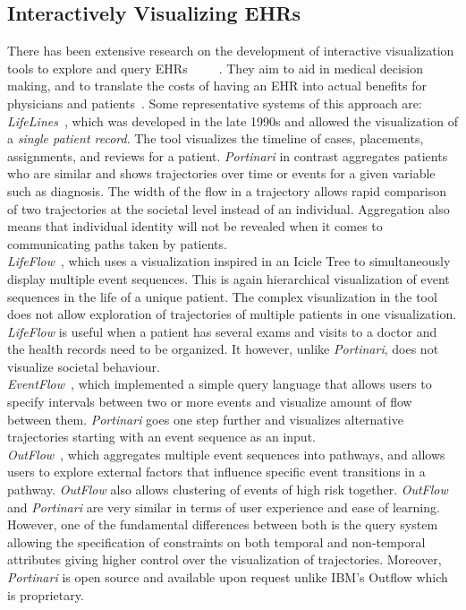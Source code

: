 \documentclass[10pt, conference]{IEEEtran}
\begin{document}
\subsection{Interactively Visualizing EHRs}
There has been extensive research on the development of interactive visualization tools to explore and query EHRs~\cite{LifeLines}~\cite{LifeFlow}~\cite{EventFlow}~\cite{OutFlow}~\cite{DecisionFlow}.  They aim to aid in medical decision making, and to translate the costs of having an EHR into actual benefits for physicians and patients~\cite{EhrVisSurvey}. 
Some representative systems of this approach are:\\
\noindent \textit{LifeLines}~\cite{LifeLines}, which was developed in the late 1990s and allowed the visualization of a \emph{single patient record}. The tool visualizes the timeline of cases, placements, assignments, and reviews for a patient. \textit{Portinari} in contrast aggregates patients who are similar and shows trajectories over time or events for a given variable such as diagnosis. The width of the flow in a trajectory allows rapid comparison of two trajectories at the societal level instead of an individual. Aggregation also means that individual identity will not be revealed when it comes to communicating paths taken by patients.\\
\noindent \textit{LifeFlow}~\cite{LifeFlow}, which uses a visualization inspired in an Icicle Tree to simultaneously display multiple event sequences. This is again hierarchical visualization of event sequences in the life of a unique patient. The complex visualization in the tool  does not allow exploration of trajectories of multiple patients in one visualization. \textit{LifeFlow} is useful when a patient has several exams and visits to a doctor and the health records need to be organized. It however, unlike \textit{Portinari}, does not visualize societal behaviour.\\
\noindent \textit{EventFlow}~\cite{EventFlow}, which implemented a simple query language that allows users to specify intervals between two or more events and visualize amount of flow between them. \textit{Portinari} goes one step further and visualizes alternative trajectories starting with an event sequence as an input. \\
\noindent \textit{OutFlow}~\cite{OutFlow}, which aggregates multiple event sequences into pathways, and allows users to explore external factors that influence  specific event transitions in a pathway. \textit{OutFlow} also allows clustering of events of high risk together. \textit{OutFlow} and \textit{Portinari} are very similar in terms of user experience and ease of learning. However, one of the fundamental differences between both is the query system allowing the specification of constraints on both temporal and non-temporal attributes giving  higher control over the visualization of trajectories. Moreover,  \textit{Portinari} is open source and available upon request unlike IBM's Outflow which is proprietary. \\
\end{document}
